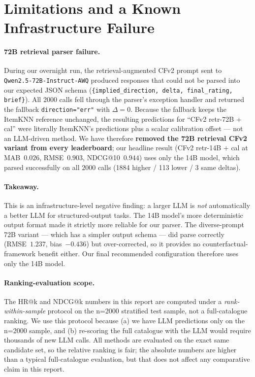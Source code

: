 \documentclass[11pt,a4paper]{article}
\begin{document}
\section{Limitations and a Known Infrastructure Failure}
\label{sec:limitations}

\paragraph{72B retrieval parser failure.}
During our overnight run, the retrieval-augmented CFv2 prompt sent to
\texttt{Qwen2.5-72B-Instruct-AWQ} produced responses that could not be
parsed into our expected JSON schema (\texttt{\{implied\_direction,
delta, final\_rating, brief\}}). All $2000$ calls fell through the
parser's exception handler and returned the fallback
\texttt{direction="err"} with $\Delta=0$. Because the fallback keeps the
ItemKNN reference unchanged, the resulting predictions for ``CFv2 retr-72B +
cal'' were literally ItemKNN's predictions plus a scalar calibration
offset --- not an LLM-driven method. We have therefore \textbf{removed
the 72B retrieval CFv2 variant from every leaderboard}; our headline
result (CFv2 retr-14B $+$ cal at MAB~$0.026$, RMSE~$0.903$, NDCG@10~$0.944$)
uses only the 14B model, which parsed successfully on all $2000$ calls
(1884 higher / 113 lower / 3 same deltas).

\paragraph{Takeaway.}
This is an infrastructure-level negative finding: a larger LLM is
\emph{not} automatically a better LLM for structured-output tasks. The
14B model's more deterministic output format made it strictly more
reliable for our parser. The diverse-prompt 72B variant --- which has a
simpler output schema --- did parse correctly (RMSE~$1.237$, bias~$-0.436$)
but over-corrected, so it provides no counterfactual-framework benefit
either. Our final recommended configuration therefore uses only the 14B model.

\paragraph{Ranking-evaluation scope.}
The HR@k and NDCG@k numbers in this report are computed under a
\emph{rank-within-sample} protocol on the n=2000 stratified test sample,
not a full-catalogue ranking. We use this protocol because (a) we have
LLM predictions only on the n=2000 sample, and (b) re-scoring the full
catalogue with the LLM would require thousands of new LLM calls. All
methods are evaluated on the exact same candidate set, so the relative
ranking is fair; the absolute numbers are higher than a typical
full-catalogue evaluation, but that does not affect any comparative
claim in this report.
\end{document}

